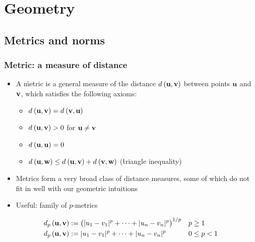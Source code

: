 \documentclass[t]{beamer} %
\begin{document}
\section{Geometry}

\subsection{Metrics and norms}

\begin{frame}
  \frametitle{Metric: a measure of distance}

  \begin{itemize}
  \item A \h{metric} is a general measure of the distance $\dist{\vu}{\vv}$
    between points $\vu$ and $\vv$, which satisfies the following axioms:
    \begin{itemize}
      \item $\dist{\vu}{\vv} = \dist{\vv}{\vu}$
      \item $\dist{\vu}{\vv} > 0$ for $\vu \neq \vv$
      \item $\dist{\vu}{\vu} = 0$
      \item $\dist{\vu}{\vw} \leq \dist{\vu}{\vv} + \dist{\vv}{\vw}$
        (\h{triangle inequality})
    \end{itemize}
  \item Metrics form a very broad class of distance measures, some of which do
    not fit in well with our geometric intuitions
  \item<2-> Useful: family of  $p$-metrics
  \end{itemize}

  \ungap[2]
  \begin{align*}
    \dist[p]{\vu}{\vv} 
    &\coloneq \bigl( \abs{u_1 - v_1}^p + \dots + \abs{u_n - v_n}^p \bigr)^{1/p}
    && p \geq 1 \\
    \dist[p]{\vu}{\vv} 
    &\coloneq \abs{u_1 - v_1}^p + \dots + \abs{u_n - v_n}^p 
    && 0 \leq p < 1
  \end{align*}
  
\end{frame}
\end{document}
